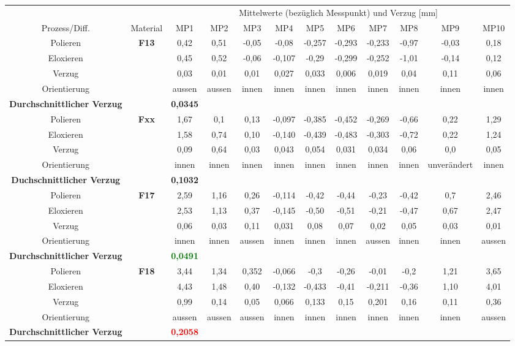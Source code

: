 \documentclass[12pt,a4paper,parskip,twoside,BCOR5mm,headsepline]{scrartcl}
\begin{document}
\begin{description*}
\begin{table}
\begin{tabular}{cccccccccccc}
\toprule
&& \multicolumn{10}{c}{Mittelwerte (bezüglich Messpunkt) und Verzug [\si{\milli\meter}]} \\
\cmidrule(2){3-12}
Prozess/Diff. & Material & MP1 & MP2 & MP3 & MP4 & MP5 & MP6 & MP7 & MP8 & MP9 & MP10 \\
\midrule
Polieren & \textbf{F13} & 0,42 & 0,51  & -0,05  & -0,08  & -0,257  & -0,293  &-0,233  &-0,97  & -0,03 &0,18  \\
Eloxieren &&0,45  &0,52  & -0,06 &-0,107  &-0,29  &-0,299  &-0,252  &-1,01  & -0,14 &0,12  \\
Verzug &&0,03  &0,01  &0,01  &0,027  &0,033  &0,006  &0,019 &0,04  &0,11  &0,06 \\
Orientierung &&aussen & aussen &innen & innen &innen & innen & innen & innen & innen &innen  \\
\textbf{Durchschnittlicher Verzug} &&\textbf{0,0345}&&&&&&&&&\\
\midrule
Polieren & \textbf{Fxx} &1,67  &0,1  & 0,13 &-0,097  & -0,385 &-0,452  &-0,269  &-0,66  &0,22  &1,29 \\
Eloxieren &&1,58  & 0,74 &0,10  &-0,140  &-0,439  &-0,483  &-0,303  & -0,72 & 0,22 &1,24  \\
Verzug && 0,09 & 0,64 &0,03  &0,043 &0,054  & 0,031  & 0,034&0,06  & 0,0 & 0,05  \\
Orientierung && innen &innen  & innen & innen &innen  &innen & innen &innen  & unverändert &innen  \\
\textbf{Duchschnittlicher Verzug} && \textbf{0,1032}&&&&&&&&&\\
\midrule
Polieren & \textbf{F17} &2,59  &1,16  & 0,26 &-0,114  &-0,42  & -0,44 &-0,23  &-0,42  &0,7  & 2,46 \\
Eloxieren &&2,53  &1,13  &0,37  &-0,145  &-0,50   &-0,51   &-0,21   &-0,47  & 0,67 &2,47   \\
Verzug && 0,06 &0,03  &0,11  & 0,031 &0,08  &0,07  &0,02   &0,05  &0,03  & 0,01 \\
Orientierung &&innen  & innen &aussen &innen  &innen  &innen  &aussen & innen &innen &aussen  \\
\textbf{Durchschnittlicher Verzug} && \textbf{\textcolor{green}{0,0491}} &&&&&&&&&\\
\midrule
Polieren & \textbf{F18} &3,44  & 1,34 &0,352  &-0,066  &-0,3  &-0,26  &-0,01  & -0,2 &1,21  & 3,65 \\
Eloxieren &&4,43  &1,48  &0,40  &-0,132  &-0,433  &-0,41  &-0,211  &-0,36  &1,10  &4,01  \\
Verzug &&0,99  & 0,14 &0,05 &0,066  &0,133  &0,15 & 0,201&0,16 &0,11  &0,36  \\
Orientierung && aussen&aussen  &aussen  & innen &innen  & innen &innen  & innen &innen  & aussen \\
\textbf{Durchschnittlicher Verzug} && \textbf{\textcolor{red}{0,2058}} &&&&&&&&&\\
\bottomrule


\end{tabular}
\end{table}
\end{description*}
\end{document}
